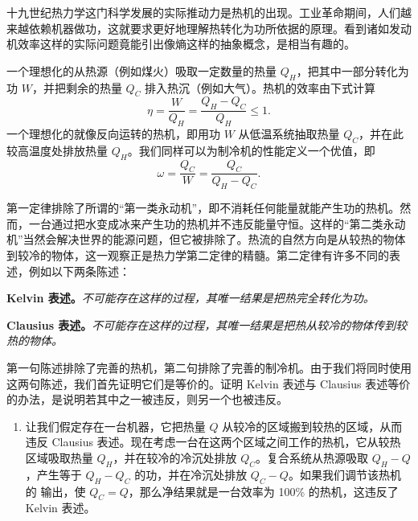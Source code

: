 
十九世纪热力学这门科学发展的实际推动力是热机的出现。工业革命期间，人们越来越依赖机器做功，这就要求更好地理解热转化为功所依据的原理。看到诸如发动机效率这样的实际问题竟能引出像熵这样的抽象概念，是相当有趣的。

一个理想化的从热源（例如煤火）吸取一定数量的热量 $Q_H$，把其中一部分转化为功
$W$，并把剩余的热量 $Q_C$ 排入热沉（例如大气）。热机的效率由下式计算
\begin{equation}
\eta=\frac{W}{Q_H}=\frac{Q_H-Q_C}{Q_H}\le1.
\label{eq:1.16}
\end{equation}
一个理想化的就像反向运转的热机，即用功 $W$ 从低温系统抽取热量 $Q_C$，并在此较高温度处排放热量 $Q_H$。我们同样可以为制冷机的性能定义一个优值，即
\begin{equation}
\omega=\frac{Q_C}{W}=\frac{Q_C}{Q_H-Q_C}.
\label{eq:1.17}
\end{equation}


第一定律排除了所谓的“第一类永动机”，即不消耗任何能量就能产生功的热机。然而，一台通过把水变成冰来产生功的热机并不违反能量守恒。这样的“第二类永动机”当然会解决世界的能源问题，但它被排除了。热流的自然方向是从较热的物体到较冷的物体，这一观察正是热力学第二定律的精髓。第二定律有许多不同的表述，例如以下两条陈述：

\textbf{Kelvin 表述。}\quad\emph{不可能存在这样的过程，其唯一结果是把热完全转化为功。}

\textbf{Clausius 表述。}\quad\emph{不可能存在这样的过程，其唯一结果是把热从较冷的物体传到较热的物体。}

第一句陈述排除了完善的热机，第二句排除了完善的制冷机。由于我们将同时使用这两句陈述，我们首先证明它们是等价的。证明 Kelvin 表述与 Clausius 表述等价的办法，是说明若其中之一被违反，则另一个也被违反。

\begin{enumerate}[label=(\alph*), leftmargin=2.2em, itemsep=0.3em]
  \item 让我们假定存在一台机器，它把热量 $Q$ 从较冷的区域搬到较热的区域，从而违反 Clausius 表述。现在考虑一台在这两个区域之间工作的热机，它从较热区域吸取热量 $Q_H$，并在较冷的冷沉处排放 $Q_C$。复合系统从热源吸取 $Q_H-Q$，产生等于 $Q_H-Q_C$ 的功，并在冷沉处排放 $Q_C-Q$。如果我们调节该热机的
  输出，使 $Q_C=Q$，那么净结果就是一台效率为 100\% 的热机，这违反了 Kelvin 表述。
\end{enumerate}

